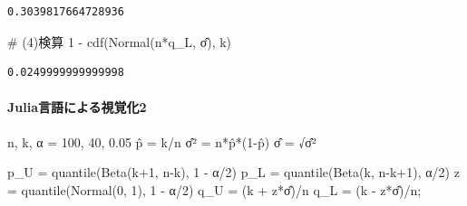 \documentclass[
  letterpaper,
  DIV=11,
  numbers=noendperiod]{scrartcl}
\let\oldparagraph\paragraph
\renewcommand{\paragraph}[1]{\oldparagraph{#1}\mbox{}}
\newenvironment{Shaded}{\begin{snugshade}}{\end{snugshade}}
\newcommand{\CommentTok}[1]{\textcolor[rgb]{0.37,0.37,0.37}{#1}}
\newcommand{\FloatTok}[1]{\textcolor[rgb]{0.68,0.00,0.00}{#1}}
\newcommand{\FunctionTok}[1]{\textcolor[rgb]{0.28,0.35,0.67}{#1}}
\newcommand{\NormalTok}[1]{\textcolor[rgb]{0.00,0.23,0.31}{#1}}
\newcommand{\OperatorTok}[1]{\textcolor[rgb]{0.37,0.37,0.37}{#1}}
\begin{document}
\begin{verbatim}
0.3039817664728936
\end{verbatim}

\begin{Shaded}
\begin{Highlighting}[]
\CommentTok{\# (4)検算}
\FloatTok{1} \OperatorTok{{-}} \FunctionTok{cdf}\NormalTok{(}\FunctionTok{Normal}\NormalTok{(n}\OperatorTok{*}\NormalTok{q\_L, σ̂), k)}
\end{Highlighting}
\end{Shaded}

\begin{verbatim}
0.0249999999999998
\end{verbatim}

\hypertarget{juliaux8a00ux8a9eux306bux3088ux308bux8996ux899aux53162}{%
\paragraph{Julia言語による視覚化2}\label{juliaux8a00ux8a9eux306bux3088ux308bux8996ux899aux53162}}

\begin{Shaded}
\begin{Highlighting}[]
\NormalTok{n, k, α }\OperatorTok{=} \FloatTok{100}\NormalTok{, }\FloatTok{40}\NormalTok{, }\FloatTok{0.05}
\NormalTok{p̂ }\OperatorTok{=}\NormalTok{ k}\OperatorTok{/}\NormalTok{n}
\NormalTok{σ̂² }\OperatorTok{=} \FunctionTok{n*p̂*}\NormalTok{(}\FloatTok{1}\OperatorTok{{-}}\NormalTok{p̂)}
\NormalTok{σ̂ }\OperatorTok{=}\NormalTok{ √σ̂²}

\NormalTok{p\_U }\OperatorTok{=} \FunctionTok{quantile}\NormalTok{(}\FunctionTok{Beta}\NormalTok{(k}\OperatorTok{+}\FloatTok{1}\NormalTok{, n}\OperatorTok{{-}}\NormalTok{k), }\FloatTok{1} \OperatorTok{{-}}\NormalTok{ α}\OperatorTok{/}\FloatTok{2}\NormalTok{)}
\NormalTok{p\_L }\OperatorTok{=} \FunctionTok{quantile}\NormalTok{(}\FunctionTok{Beta}\NormalTok{(k, n}\OperatorTok{{-}}\NormalTok{k}\OperatorTok{+}\FloatTok{1}\NormalTok{), α}\OperatorTok{/}\FloatTok{2}\NormalTok{)}
\NormalTok{z }\OperatorTok{=} \FunctionTok{quantile}\NormalTok{(}\FunctionTok{Normal}\NormalTok{(}\FloatTok{0}\NormalTok{, }\FloatTok{1}\NormalTok{), }\FloatTok{1} \OperatorTok{{-}}\NormalTok{ α}\OperatorTok{/}\FloatTok{2}\NormalTok{)}
\NormalTok{q\_U }\OperatorTok{=}\NormalTok{ (k }\OperatorTok{+}\NormalTok{ z}\OperatorTok{*}\NormalTok{σ̂)}\OperatorTok{/}\NormalTok{n}
\NormalTok{q\_L }\OperatorTok{=}\NormalTok{ (k }\OperatorTok{{-}}\NormalTok{ z}\OperatorTok{*}\NormalTok{σ̂)}\OperatorTok{/}\NormalTok{n;}
\end{Highlighting}
\end{Shaded}
\end{document}
